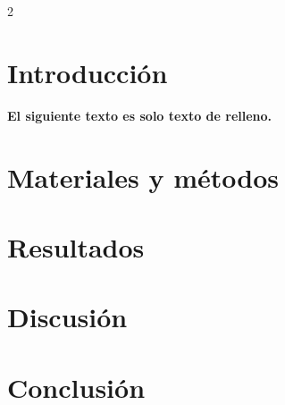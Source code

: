 

\Resumen{}{}


    \begin{multicols}{2}
    

\section{Introducción}

\textbf{El siguiente texto es solo texto de relleno.}

\lipsum

\section{Materiales y métodos}

\lipsum

\section{Resultados}

\lipsum

\section{Discusión}

\lipsum

\section{Conclusión}

\lipsum






\end{multicols}